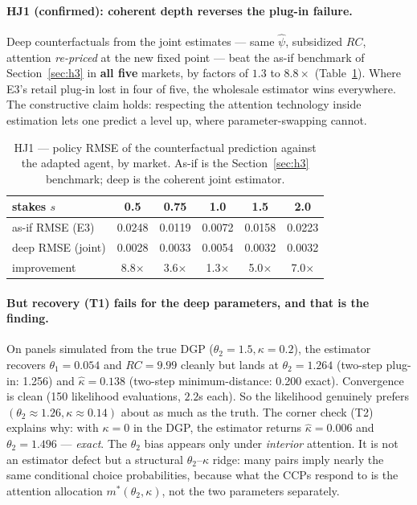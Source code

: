 \documentclass[11pt]{article}
\newcommand{\mstar}{m^{*}}
\begin{document}
\paragraph{HJ1 (confirmed): coherent depth reverses the plug-in failure.}
Deep counterfactuals from the joint estimates --- same $\widehat\psi$,
subsidized $RC$, attention \emph{re-priced} at the new fixed point --- beat
the as-if benchmark of Section~\ref{sec:h3} in \textbf{all five} markets,
by factors of $1.3$ to $8.8\times$ (Table~\ref{tab:hj1}). Where E3's retail
plug-in lost in four of five, the wholesale estimator wins everywhere. The
constructive claim holds: respecting the attention technology inside
estimation lets one predict a level up, where parameter-swapping cannot.

\begin{table}[h]\centering\small
\caption{HJ1 --- policy RMSE of the counterfactual prediction against the
adapted agent, by market. As-if is the Section~\ref{sec:h3} benchmark; deep
is the coherent joint estimator.}\label{tab:hj1}
\begin{tabular}{lccccc}
\toprule
stakes $s$ & 0.5 & 0.75 & 1.0 & 1.5 & 2.0 \\
\midrule
as-if RMSE (E3) & 0.0248 & 0.0119 & 0.0072 & 0.0158 & 0.0223 \\
deep RMSE (joint) & 0.0028 & 0.0033 & 0.0054 & 0.0032 & 0.0032 \\
improvement & 8.8$\times$ & 3.6$\times$ & 1.3$\times$ & 5.0$\times$ &
7.0$\times$ \\
\bottomrule
\end{tabular}
\end{table}

\paragraph{But recovery (T1) fails for the deep parameters, and that is the
finding.} On panels simulated from the true DGP
($\theta_2 = 1.5, \kappa = 0.2$), the estimator recovers $\theta_1 = 0.054$
and $RC = 9.99$ cleanly but lands at $\theta_2 = 1.264$ (two-step plug-in:
1.256) and $\widehat\kappa = 0.138$ (two-step minimum-distance: 0.200 exact).
Convergence is clean (150 likelihood evaluations, $2.2$s each). So the
likelihood genuinely prefers $(\theta_2 \approx 1.26, \kappa \approx 0.14)$
about as much as the truth. The corner check (T2) explains why: with
$\kappa = 0$ in the DGP, the estimator returns $\widehat\kappa = 0.006$ and
$\theta_2 = 1.496$ --- \emph{exact}. The $\theta_2$ bias appears only under
\emph{interior} attention. It is not an estimator defect but a structural
$\theta_2$--$\kappa$ ridge: many pairs imply nearly the same conditional
choice probabilities, because what the CCPs respond to is the attention
allocation $\mstar(\theta_2, \kappa)$, not the two parameters separately.
\end{document}

